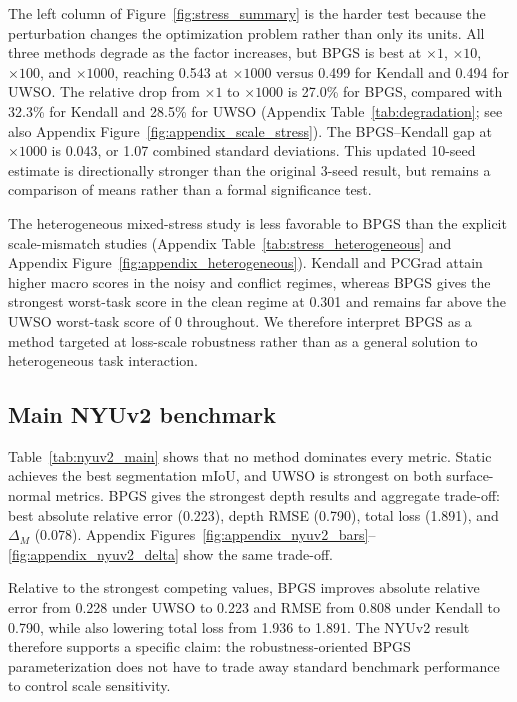 The left column of Figure~\ref{fig:stress_summary} is the harder test because the perturbation changes the optimization problem rather than only its units. All three methods degrade as the factor increases, but BPGS is best at $\times 1$, $\times 10$, $\times 100$, and $\times 1000$, reaching 0.543 at $\times 1000$ versus 0.499 for Kendall and 0.494 for UWSO. The relative drop from $\times 1$ to $\times 1000$ is 27.0\% for BPGS, compared with 32.3\% for Kendall and 28.5\% for UWSO (Appendix Table~\ref{tab:degradation}; see also Appendix Figure~\ref{fig:appendix_scale_stress}). The BPGS--Kendall gap at $\times 1000$ is 0.043, or 1.07 combined standard deviations. This updated 10-seed estimate is directionally stronger than the original 3-seed result, but remains a comparison of means rather than a formal significance test.

The heterogeneous mixed-stress study is less favorable to BPGS than the explicit scale-mismatch studies (Appendix Table~\ref{tab:stress_heterogeneous} and Appendix Figure~\ref{fig:appendix_heterogeneous}). Kendall and PCGrad attain higher macro scores in the noisy and conflict regimes, whereas BPGS gives the strongest worst-task score in the clean regime at 0.301 and remains far above the UWSO worst-task score of 0 throughout. We therefore interpret BPGS as a method targeted at loss-scale robustness rather than as a general solution to heterogeneous task interaction.

\subsection{Main NYUv2 benchmark}
Table~\ref{tab:nyuv2_main} shows that no method dominates every metric. Static achieves the best
segmentation mIoU, and UWSO is strongest on both surface-normal metrics. BPGS gives the strongest
depth results and aggregate trade-off: best absolute relative error (0.223), depth RMSE (0.790),
total loss (1.891), and $\Delta_M$ (0.078). Appendix Figures~\ref{fig:appendix_nyuv2_bars}--\ref{fig:appendix_nyuv2_delta} show the same trade-off.



Relative to the strongest competing values, BPGS improves absolute relative error from 0.228 under UWSO to 0.223 and RMSE from 0.808 under Kendall to 0.790, while also lowering total loss from 1.936 to 1.891. The NYUv2 result therefore supports a specific claim: the robustness-oriented BPGS parameterization does not have to trade away standard benchmark performance to control scale sensitivity.


